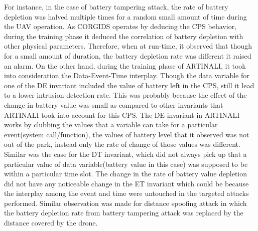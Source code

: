 For instance, in the case of battery tampering attack, the rate of battery depletion was halved multiple times for a random small amount of time during the \ac{UAV} operation. As \ac{CORGIDS} operates by deducing the \ac{CPS} behavior, during the training phase it deduced the correlation of battery depletion with other physical parameters. Therefore, when at run-time, it observed that though for a small amount of duration, the battery depletion rate was different it raised an alarm. On the other hand, during the training phase of ARTINALI, it took into consideration the Data-Event-Time interplay. Though the data variable for one of the D\textbar E invariant included the value of battery left in the \ac{CPS}, still it lead to a lower intrusion detection rate. This was probably because the effect of the change in battery value was small as compared to other invariants that ARTINALI took into account for this \ac{CPS}. The D\textbar E invariant in ARTINALI works by clubbing the values that a variable can take for a particular event(system call/function), the values of battery level that it observed was not out of the park, instead only the rate of change of those values was different. Similar was the case for the D\textbar T invariant, which did not always pick up that a particular value of data variable(battery value in this case) was supposed to be within a particular time slot. The change in the rate of battery value depletion did not have any noticeable change in the E\textbar T invariant which could be because the interplay among the event and time were untouched in the targeted attacks performed. Similar observation was made for distance spoofing attack in which the battery depletion rate from battery tampering attack was replaced by the distance covered by the drone.

